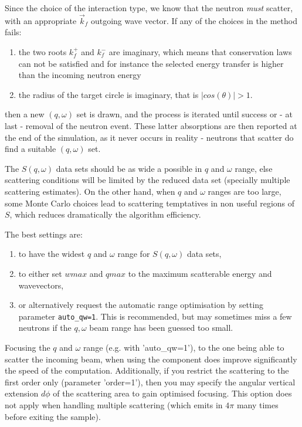 Since the choice of the interaction type, we know that the neutron \emph{must} scatter, with an appropriate $\vec k_f$ outgoing wave vector. If any of the choices in the method fails:
\begin{enumerate}
\item the two roots $k_f^+$ and $k_f^-$ are imaginary, which means that conservation laws can not be satisfied and for instance the selected energy transfer is higher than the incoming neutron energy
\item the radius of the target circle is imaginary, that is $|cos(\theta)| > 1$.
\end{enumerate}
then a new $(q, \omega)$ set is drawn, and the process is iterated until success or - at last - removal of the neutron event. These latter absorptions are then reported at the end of the simulation, as it never occurs in reality - neutrons that scatter do find a suitable $(q, \omega)$ set.

The $S(q,\omega)$ data sets should be as wide a possible in $q$ and $\omega$ range, else scattering conditions will be limited by the reduced data set (specially multiple scattering estimates). On the other hand, when $q$ and $\omega$ ranges are too large, some Monte Carlo choices lead to scattering temptatives in non useful regions of $S$, which reduces dramatically the algorithm efficiency.

The best settings are:
\begin{enumerate}
\item to have the widest $q$ and $\omega$ range for $S(q,\omega)$ data sets,
\item to either set $wmax$ and $qmax$ to the maximum scatterable energy and wavevectors,
\item or alternatively request the automatic range optimisation by setting parameter \verb+auto_qw=1+. This is recommended, but may sometimes miss a few neutrons if the $q,\omega$ beam range has been guessed too small.
\end{enumerate}

Focusing the $q$ and $\omega$ range (e.g. with 'auto\_qw=1'), to the one being able to scatter the incoming beam, when using the component does improve significantly the speed of the computation. Additionally, if you restrict the scattering to the first order only (parameter 'order=1'), then you may specify the angular vertical extension $d\phi$ of the scattering area to gain optimised focusing. This option does not apply when handling multiple scattering (which emits in $4\pi$ many times before exiting the sample).

